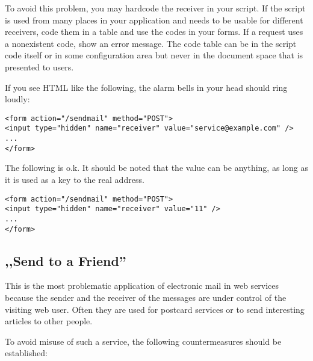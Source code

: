 \documentclass{article}
\begin{document}
To avoid this problem, you may hardcode the receiver in your script. If
the script is used from many places in your application and needs to be
usable for different receivers, code them in a table and use the codes
in your forms. If a request uses a nonexistent code, show an error
message. The code table can be in the script code itself or in some
configuration area but never in the document space that is presented to
users.

If you see HTML like the following, the alarm bells in your head should
ring loudly:

\begin{scriptsize}
\begin{verbatim}
<form action="/sendmail" method="POST">
<input type="hidden" name="receiver" value="service@example.com" />
...
</form>
\end{verbatim}
\end{scriptsize}

The following is o.k. It should be noted that the value can be
anything, as long as it is used as a key to the real address.

\begin{scriptsize}
\begin{verbatim}
<form action="/sendmail" method="POST">
<input type="hidden" name="receiver" value="11" />
...
</form>
\end{verbatim}
\end{scriptsize}


\subsection{,,Send to a Friend''}

This is the most problematic application of electronic mail in web
services because the sender and the receiver of the messages are under
control of the visiting web user. Often they are used for postcard
services or to send interesting articles to other people.

To avoid misuse of such a service, the following countermeasures
should be established:
\end{document}
